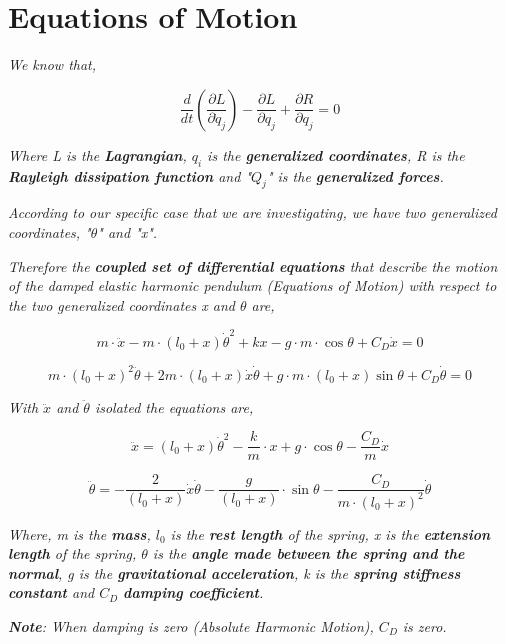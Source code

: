 
\section{{Equations of Motion}}
            
    \textit{We know that,}
            
        $$\frac{d}{dt}\left(\frac{\partial L}{\partial \dot{q}_j}\right) - \frac{\partial L}{\partial q_j} + \frac{\partial R}{\partial q_j} = 0$$
            
    \textit{Where L is the \textbf{Lagrangian}, $q_i$ is the \textbf{generalized coordinates}, R is the \textbf{Rayleigh dissipation function} and "$Q_j$" is the \textbf{generalized forces}.}
            
    \textit{According to our specific case that we are investigating, we have two generalized coordinates, "$\theta$" and "x".}        
            
    \textit{Therefore the \textbf{coupled set of differential equations} that describe the motion of the damped elastic harmonic pendulum (Equations of Motion) with respect to the two generalized coordinates x and $\theta$ are,}
            
        $$m\cdot\ddot{x} -m\cdot(l_0+x)\dot{\theta}^2 + kx - g\cdot m\cdot\cos{\theta} + C_D\dot{x} = 0$$
            
        $$m\cdot(l_0+x)^2\ddot{\theta} + 2m\cdot(l_0+x)\dot{x}\dot{\theta} + g\cdot m\cdot(l_0+x)\sin{\theta} + C_D\dot{\theta} = 0$$
            
    \textit{With $\ddot{x}$ and $\ddot{\theta}$ isolated the equations are,}
            
        $$\ddot{x} = (l_0+x)\dot{\theta}^2 - \frac{k}{m}\cdot x + g\cdot\cos{\theta} - \frac{C_D}{m}\dot{x}$$
            
        $$\ddot{\theta} = - \frac{2}{(l_0+x)}\dot{x}\dot{\theta} - \frac{g}{(l_0+x)}\cdot\sin{\theta} - \frac{C_D}{m\cdot(l_0+x)^2}\dot{\theta}$$
            
    \textit{Where, m is the \textbf{mass}, $l_0$ is the \textbf{rest length} of the spring, x is the \textbf{extension length} of the spring, $\theta$ is the \textbf{angle made between the spring and the normal}, g is the \textbf{gravitational acceleration}, k is the \textbf{spring stiffness constant} and $C_D$ \textbf{damping coefficient}.}
            
    \textit{\textbf{Note}: When damping is zero (Absolute Harmonic Motion), $C_D$ is zero.}
            
